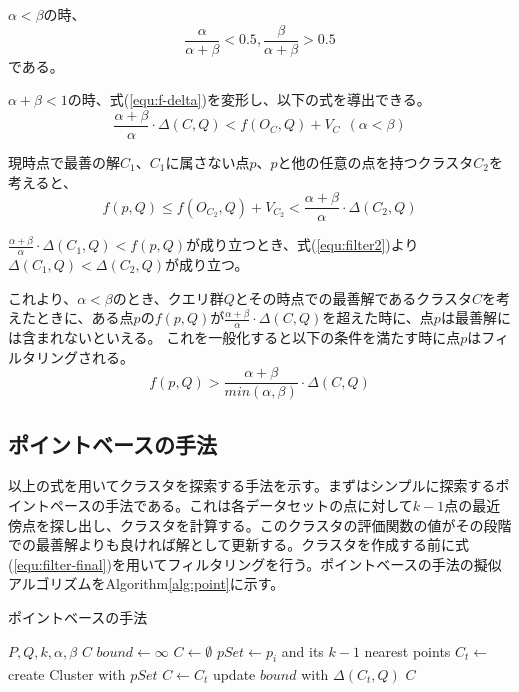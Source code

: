 \documentclass{deimj}
\begin{document}
$\alpha < \beta$の時、
$$\frac{\alpha}{\alpha+\beta}  < 0.5, \frac{\beta}{\alpha+\beta} > 0.5$$
である。

$\alpha + \beta < 1$の時、式(\ref{equ:f-delta})を変形し、以下の式を導出できる。
\begin{equation}
\label{equ:filter1}
\frac{\alpha + \beta}{\alpha}\cdot \Delta(C,Q) < f(O_C, Q) + V_C\ \  (\alpha < \beta)
\end{equation}

現時点で最善の解$C_1$、$C_1$に属さない点$p$、$p$と他の任意の点を持つクラスタ$C_2$を考えると、
\begin{equation}
\label{equ:filter2}
f(p,Q) \leq f(O_{C_2},Q)+V_{C_2} < \frac{\alpha + \beta}{\alpha}\cdot \Delta(C_2,Q)
\end{equation}

$\frac{\alpha + \beta}{\alpha} \cdot \Delta(C_1,Q) < f(p,Q)$が成り立つとき、式(\ref{equ:filter2})より$\Delta(C_1,Q) < \Delta(C_2,Q)$が成り立つ。

これより、$\alpha < \beta$のとき、クエリ群$Q$とその時点での最善解であるクラスタ$C$を考えたときに、ある点$p$の$f(p,Q)$が$\frac{\alpha + \beta}{\alpha} \cdot \Delta(C,Q)$を超えた時に、点$p$は最善解には含まれないといえる。
これを一般化すると以下の条件を満たす時に点$p$はフィルタリングされる。
\begin{equation}
\label{equ:filter-final}
f(p,Q) > \frac{\alpha + \beta}{min(\alpha, \beta)} \cdot  \Delta(C,Q)
\end{equation}

\subsection{ポイントベースの手法}
以上の式を用いてクラスタを探索する手法を示す。まずはシンプルに探索するポイントペースの手法である。これは各データセットの点に対して$k-1$点の最近傍点を探し出し、クラスタを計算する。このクラスタの評価関数の値がその段階での最善解よりも良ければ解として更新する。クラスタを作成する前に式(\ref{equ:filter-final})を用いてフィルタリングを行う。ポイントベースの手法の擬似アルゴリズムをAlgorithm\ref{alg:point}に示す。

\begin{algorithm}                      
\caption{ポイントベースの手法}         
\label{alg:point}
\begin{algorithmic}[1]                  
\renewcommand{\algorithmicrequire}{\textbf{Input:}}
\renewcommand{\algorithmicensure}{\textbf{Output:}}
\REQUIRE $P,Q,k,\alpha, \beta$
\ENSURE $C$
\STATE $bound \xleftarrow[]{} \infty$
\STATE $C \xleftarrow[]{} \emptyset$
\STATE $pSet \xleftarrow{} p_i$ and its $k-1$ nearest points
\STATE $C_t \xleftarrow{}$ create Cluster with $pSet$
\STATE $C \xleftarrow{} C_t$
\STATE update $bound$ with $\Delta(C_t,Q)$
\ENDIF
\ENDIF
\ENDFOR
\RETURN $C$
\end{algorithmic}
\end{algorithm}
\end{document}
